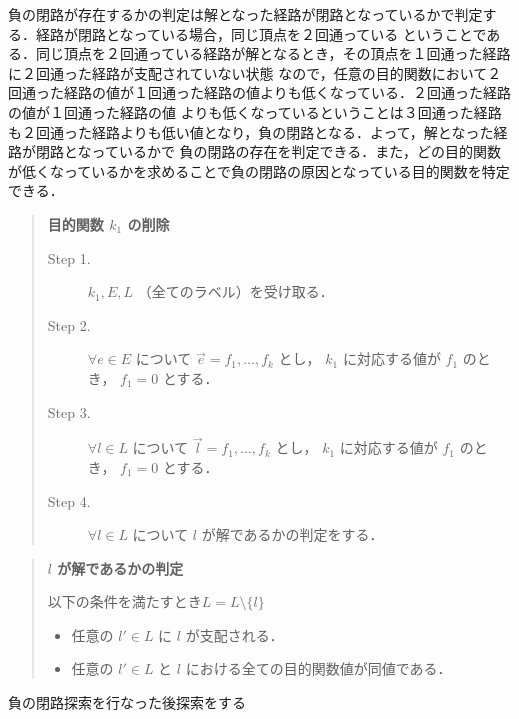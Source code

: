 \documentclass[12pt]{optlab-bachelor}
\begin{document}
負の閉路が存在するかの判定は解となった経路が閉路となっているかで判定する．経路が閉路となっている場合，同じ頂点を２回通っている
ということである．同じ頂点を２回通っている経路が解となるとき，その頂点を１回通った経路に２回通った経路が支配されていない状態
なので，任意の目的関数において２回通った経路の値が１回通った経路の値よりも低くなっている．２回通った経路の値が１回通った経路の値
よりも低くなっているということは３回通った経路も２回通った経路よりも低い値となり，負の閉路となる．よって，解となった経路が閉路となっているかで
負の閉路の存在を判定できる．また，どの目的関数が低くなっているかを求めることで負の閉路の原因となっている目的関数を特定できる．

\begin{quote}
  \textbf{目的関数 $k_1$ の削除}
  \begin{description}
    \item[Step 1.] $k_1,E,L$ （全てのラベル）を受け取る．
    \item[Step 2.] $\forall e \in E$ について $\vec{e}={f_1,\ldots,f_k}$ とし， $k_1$ に対応する値が
    $f_1$ のとき， $f_1=0$ とする．
    \item[Step 3.] $\forall l \in L$ について $\vec{l}={f_1,\ldots,f_k}$ とし， $k_1$ に対応する値が
    $f_1$ のとき， $f_1=0$ とする．
    \item[Step 4.] $\forall l \in L$ について $l$ が解であるかの判定をする．
  \end{description}
\end{quote}

\begin{quote}
  \textbf{ $l$ が解であるかの判定}

  以下の条件を満たすとき$L=L \setminus \{ l\}$
    \begin{itemize}
      \item 任意の $l' \in L$ に $l$ が支配される．
      \item 任意の $l' \in L$ と $l$ における全ての目的関数値が同値である．
    \end{itemize}
\end{quote}

\begin{description}
  \item[負の閉路探索を行なった後探索をする]
\end{description}
\end{document}
